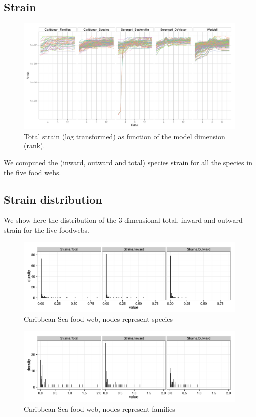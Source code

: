 \documentclass[11pt,article,oneside]{memoir}
\makeatletter
\def\maxwidth{\ifdim\Gin@nat@width>\linewidth\linewidth
\else\Gin@nat@width\fi}
\let\Oldincludegraphics\includegraphics
\renewcommand{\includegraphics}[1]{\Oldincludegraphics[width=\maxwidth]{#1}}
\makeatother
\begin{document}
\newpage

\subsection{Strain}\label{strain}

\begin{figure}[htbp]
\centering
\includegraphics{Images/strains_log.pdf}
\caption{Total strain (log transformed) as function of the model
dimension (rank).}
\end{figure}

We computed the (inward, outward and total) species strain for all the
species in the five food webs.

\newpage

\subsection{Strain distribution}\label{strain-distribution}

We show here the distribution of the 3-dimensional total, inward and
outward strain for the five foodwebs.

\begin{figure}[htbp]
\centering
\includegraphics{Images/Distrs/Caribbean_Speciesdistr.pdf}
\caption{Caribbean Sea food web, nodes represent species}
\end{figure}

\begin{figure}[htbp]
\centering
\includegraphics{Images/Distrs/Caribbean_Familiesdistr.pdf}
\caption{Caribbean Sea food web, nodes represent families}
\end{figure}
\end{document}
